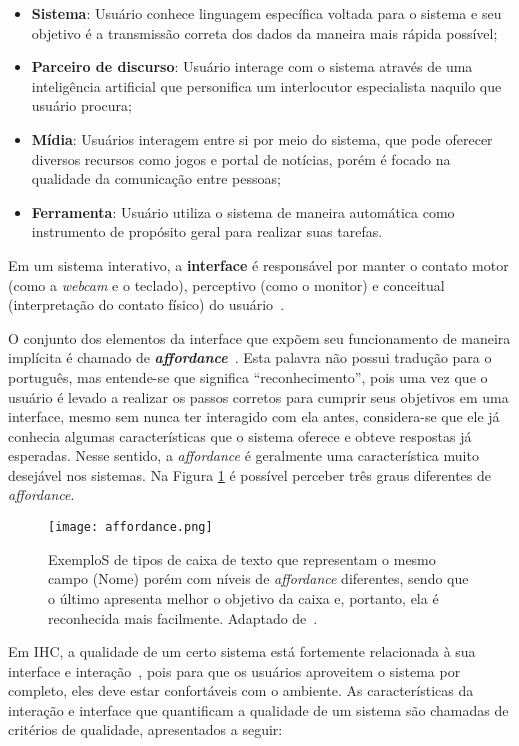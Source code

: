 \begin{itemize}
\item[1] \textbf{Sistema}: Usuário conhece linguagem específica voltada para o sistema e seu objetivo é a transmissão correta dos dados da maneira mais rápida possível;
\item[2] \textbf{Parceiro de discurso}: Usuário interage com o sistema através de uma inteligência artificial que personifica um interlocutor especialista naquilo que usuário procura;
\item[3] \textbf{Mídia}: Usuários interagem entre si por meio do sistema, que pode oferecer diversos recursos como jogos e portal de notícias, porém é focado na qualidade da comunicação entre pessoas;
\item[4] \textbf{Ferramenta}: Usuário utiliza o sistema de maneira automática como instrumento de propósito geral para realizar suas tarefas. 
\end{itemize}

\indent Em um sistema interativo, a \textbf{interface} é responsável por manter o contato motor (como a \textit{webcam} e o teclado), perceptivo (como o monitor) e conceitual (interpretação do contato físico) do usuário~\cite{IHCbook}. 

\indent O conjunto dos elementos da interface que expõem seu funcionamento de maneira implícita é chamado de \textbf{\textit{affordance}}~\cite{IHCbook}. Esta palavra não possui tradução para o português, mas entende-se que significa ``reconhecimento'', pois uma vez que o usuário é levado a realizar os passos corretos para cumprir seus objetivos em uma interface, mesmo sem nunca ter interagido com ela antes, considera-se que ele já conhecia algumas características que o sistema oferece e obteve respostas já esperadas. Nesse sentido, a \textit{affordance} é geralmente uma característica muito desejável nos sistemas. Na Figura \ref{fig:Affordance} é possível perceber três graus diferentes de \textit{affordance}.

\begin{figure}[!h]
    \centering
    \texttt{[image: affordance.png]}
    \caption{ExemploS de tipos de caixa de texto que representam o mesmo campo (Nome) porém com níveis de \textit{affordance} diferentes, sendo que o último apresenta melhor o objetivo da caixa e, portanto, ela é reconhecida mais facilmente. Adaptado de~\cite{affordance}.}
    \label{fig:Affordance}
\end{figure} 

\indent Em IHC, a qualidade de um certo sistema está fortemente relacionada à sua interface e interação~\cite{IHCbook}, pois para que os usuários aproveitem o sistema por completo, eles deve estar confortáveis com o ambiente. As características da interação e interface que quantificam a qualidade de um sistema são chamadas de critérios de qualidade, apresentados a seguir:

